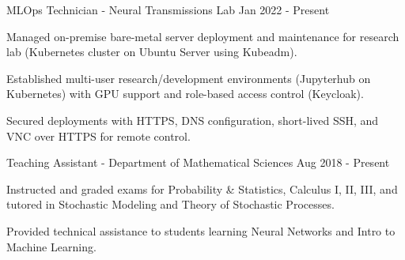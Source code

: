 \begin{cventries}
	\vspace{-2mm}

	\cventry
	{MLOps Technician - Neural Transmissions Lab}
	{}
	{}
	{Jan 2022 - Present}
	{\begin{cvitems}
			\item {Managed on-premise bare-metal server deployment and maintenance for research lab (Kubernetes cluster on Ubuntu Server using Kubeadm).}
			\item {Established multi-user research/development environments (Jupyterhub on Kubernetes) with GPU support and role-based access control (Keycloak).}
			\item {Secured deployments with HTTPS, DNS configuration, short-lived SSH, and VNC over HTTPS for remote control.}
		\end{cvitems}}

	\vspace{-2mm}

	\cventry
	{Teaching Assistant - Department of Mathematical Sciences}
	{}
	{}
	{Aug 2018 - Present}
	{\begin{cvitems}
			\item {Instructed and graded exams for Probability \& Statistics, Calculus I, II, III, and tutored in Stochastic Modeling and Theory of Stochastic Processes.}
			\item {Provided technical assistance to students learning Neural Networks and Intro to Machine Learning.}
		\end{cvitems}}

	\vspace{-1mm}


\end{cventries}